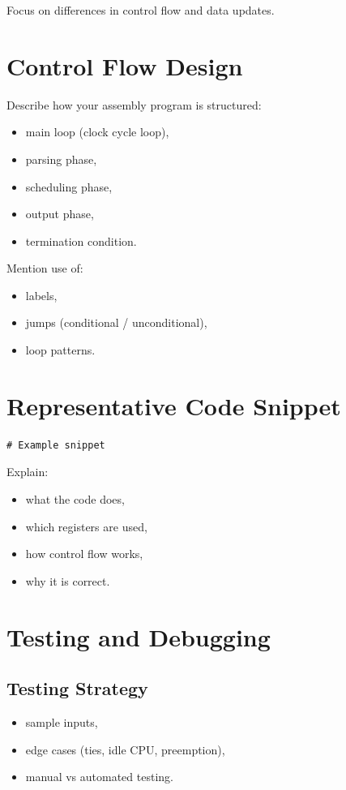 \documentclass[a4paper,12pt]{article}
\begin{document}
Focus on differences in control flow and data updates.

\section{Control Flow Design}

Describe how your assembly program is structured:

\begin{itemize}
\item main loop (clock cycle loop),
\item parsing phase,
\item scheduling phase,
\item output phase,
\item termination condition.
\end{itemize}

Mention use of:
\begin{itemize}
\item labels,
\item jumps (conditional / unconditional),
\item loop patterns.
\end{itemize}


\section{Representative Code Snippet}

\begin{lstlisting}[style=AsmStyle]
# Example snippet
\end{lstlisting}

Explain:
\begin{itemize}
\item what the code does,
\item which registers are used,
\item how control flow works,
\item why it is correct.
\end{itemize}

\section{Testing and Debugging}

\subsection{Testing Strategy}

\begin{itemize}
\item sample inputs,
\item edge cases (ties, idle CPU, preemption),
\item manual vs automated testing.
\end{itemize}
\end{document}
